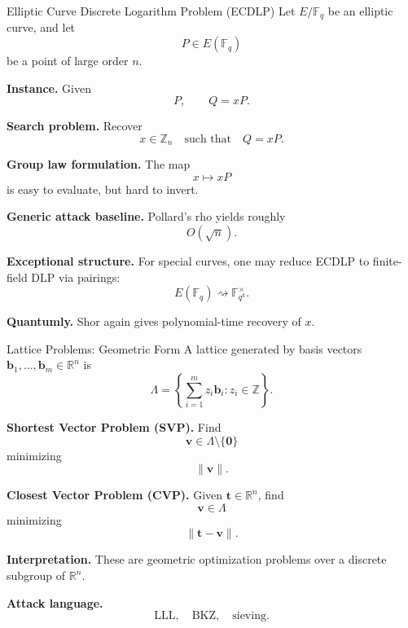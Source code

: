 \documentclass[aspectratio=169]{beamer}
\begin{document}
	
	\begin{frame}{Elliptic Curve Discrete Logarithm Problem (ECDLP)}
		Let $E/\mathbb{F}_q$ be an elliptic curve, and let
		\[
		P \in E(\mathbb{F}_q)
		\]
		be a point of large order $n$.
		
		\textbf{Instance.}
		Given
		\[
		P, \qquad Q = xP.
		\]
		
		\textbf{Search problem.}
		Recover
		\[
		x \in \mathbb{Z}_n
		\quad \text{such that} \quad
		Q = xP.
		\]
		
		\vspace{0.4em}
		\textbf{Group law formulation.}
		The map
		\[
		x \longmapsto xP
		\]
		is easy to evaluate, but hard to invert.
		
		\vspace{0.4em}
		\textbf{Generic attack baseline.}
		Pollard's rho yields roughly
		\[
		O(\sqrt{n}).
		\]
		
		\vspace{0.4em}
		\textbf{Exceptional structure.}
		For special curves, one may reduce ECDLP to finite-field DLP via pairings:
		\[
		E(\mathbb{F}_q) \rightsquigarrow \mathbb{F}_{q^k}^{\times}.
		\]
		
		\vspace{0.4em}
		\textbf{Quantumly.}
		Shor again gives polynomial-time recovery of $x$.
	\end{frame}
	
	
	\begin{frame}{Lattice Problems: Geometric Form}
		A lattice generated by basis vectors $\bm{b}_1,\dots,\bm{b}_m \in \mathbb{R}^n$ is
		\[
		\Lambda = \left\{ \sum_{i=1}^m z_i \bm{b}_i : z_i \in \mathbb{Z} \right\}.
		\]
		
		\textbf{Shortest Vector Problem (SVP).}
		Find
		\[
		\bm{v} \in \Lambda \setminus \{\bm{0}\}
		\]
		minimizing
		\[
		\|\bm{v}\|.
		\]
		
		\textbf{Closest Vector Problem (CVP).}
		Given $\bm{t} \in \mathbb{R}^n$, find
		\[
		\bm{v} \in \Lambda
		\]
		minimizing
		\[
		\|\bm{t}-\bm{v}\|.
		\]
		
		\vspace{0.4em}
		\textbf{Interpretation.}
		These are geometric optimization problems over a discrete subgroup of $\mathbb{R}^n$.
		
		\vspace{0.4em}
		\textbf{Attack language.}
		\[
		\text{LLL}, \quad \text{BKZ}, \quad \text{sieving}.
		\]
	\end{frame}
	
\end{document}
